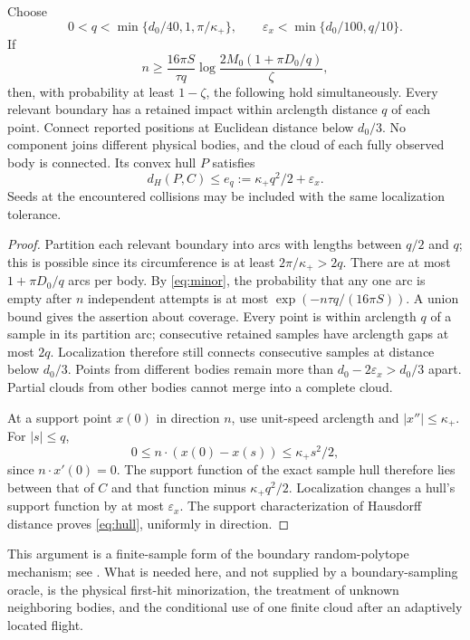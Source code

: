 \begin{lemma}\label{lem:cloud}
Choose
\[
 0<q<\min\{d_0/40,1,\pi/\kappa_+\},\qquad
 \varepsilon_x<\min\{d_0/100,q/10\}.
\]
If
\begin{equation}\label{eq:sample-budget}
 n\ge\frac{16\pi S}{\tau q}
       \log\frac{2M_0(1+\pi D_0/q)}{\zeta},
\end{equation}
then, with probability at least $1-\zeta$, the following hold simultaneously.
Every relevant boundary has a retained impact within arclength distance
$q$ of each point. Connect reported positions at Euclidean distance below
$d_0/3$. No component joins different physical bodies, and the cloud of
each fully observed body is connected. Its convex hull $P$ satisfies
\begin{equation}\label{eq:hull}
                      d_H(P,C)\le e_q:=\kappa_+q^2/2+\varepsilon_x.
\end{equation}
Seeds at the encountered collisions may be included with the same
localization tolerance.
\end{lemma}
\begin{proof}
Partition each relevant boundary into arcs with lengths between $q/2$
and $q$; this is possible since its circumference is at least
$2\pi/\kappa_+>2q$. There are at most $1+\pi D_0/q$ arcs per body.
By \eqref{eq:minor}, the probability that any one arc is empty after
$n$ independent attempts is at most $\exp(-n\tau q/(16\pi S))$.
A union bound gives the assertion about coverage. Every point is within
arclength $q$ of a sample in its partition arc; consecutive retained
samples have arclength gaps at most $2q$. Localization therefore still
connects consecutive samples at distance below $d_0/3$. Points from
different bodies remain more than $d_0-2\varepsilon_x>d_0/3$ apart.
Partial clouds from other bodies cannot merge into a complete cloud.

At a support point $x(0)$ in direction $n$, use unit-speed arclength and
$|x''|\le\kappa_+$. For $|s|\le q$,
\[
 0\le n\cdot(x(0)-x(s))\le\kappa_+s^2/2,
\]
since $n\cdot x'(0)=0$. The support function of the exact sample hull
therefore lies between that of $C$ and that function minus
$\kappa_+q^2/2$. Localization changes a hull's support function by at
most $\varepsilon_x$. The support characterization of Hausdorff distance
proves \eqref{eq:hull}, uniformly in direction.
\end{proof}

This argument is a finite-sample form of the boundary random-polytope
mechanism; see \cite{Schneider,PSSW}. What is needed here, and not supplied
by a boundary-sampling oracle, is the physical first-hit minorization,
the treatment of unknown neighboring bodies, and the conditional use of
one finite cloud after an adaptively located flight.

